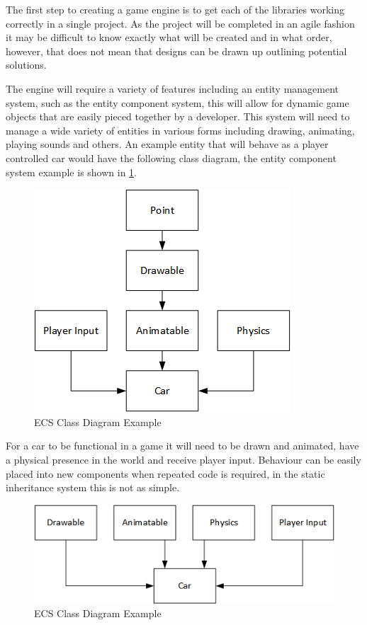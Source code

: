 \documentclass[11pt,a4paper,titlepage]{report}
\begin{document}
	The first step to creating a game engine is to get each of the libraries working correctly in a single project. As the project will be completed in an agile fashion it may be difficult to know exactly what will be created and in what order, however, that does not mean that designs can be drawn up outlining potential solutions.

	The engine will require a variety of features including an entity management system, such as the entity component system, this will allow for dynamic game objects that are easily pieced together by a developer. This system will need to manage a wide variety of entities in various forms including drawing, animating, playing sounds and others. An example entity that will behave as a player controlled car would have the following class diagram, the entity component system example is shown in \ref{fig:ClassDiagram1}.

	\begin{figure}[h] 
		\centering
		\includegraphics[scale=0.75]{ECS1}
		\caption{ECS Class Diagram Example}
		\label{fig:ClassDiagram1}
	\end{figure}

	For a car to be functional in a game it will need to be drawn and animated, have a physical presence in the world and receive player input. Behaviour can be easily placed into new components when repeated code is required, in the static inheritance system this is not as simple.

	\begin{figure}[h]
		\centering
		\includegraphics[scale=0.75]{ECS2}
		\caption{ECS Class Diagram Example}
		\label{fig:ClassDiagram2}
	\end{figure}
\end{document}
